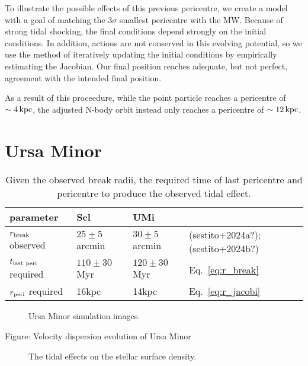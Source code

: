 To illustrate the possible effects of this previous pericentre, we
create a model with a goal of matching the \(3\sigma\) smallest
pericentre with the MW. Because of strong tidal shocking, the final
conditions depend strongly on the initial conditions. In addition,
actions are not conserved in this evolving potential, so we use the
\citet{vasiliev2024} method of iteratively updating the initial
conditions by empirically estimating the Jacobian. Our final position
reaches adequate, but not perfect, agreement with the intended final
position.

As a result of this proceedure, while the point particle reaches a
pericentre of \(\sim 4\,{\rm kpc}\), the adjusted N-body orbit instead only
reaches a pericentre of \(\sim 12\,{\rm kpc}\).

\section{Ursa Minor}\label{ursa-minor}

\begin{table*}[t]
\centering
\caption{Given the observed break radii, the required time of last pericentre and pericentre to produce the observed tidal effect.}
\begin{tabular}{llll}
\toprule
parameter & Scl & UMi & \\
\midrule
$r_{\rm break}$ observed & $25 \pm 5$ arcmin & $30 \pm 5$ arcmin & (sestito+2024a?); (sestito+2024b?)\\
$t_{\rm last\ peri}$ required & $110\pm30$ Myr & $120\pm30$ Myr & Eq. \ref{eq:r_break}\\
$r_{\rm peri}$ required & 16kpc & 14kpc & Eq. \ref{eq:r_jacobi}\\
\bottomrule
\end{tabular}
\end{table*}

\begin{figure}
\centering
{}
\caption[Ursa Minor simulation snapshots]{Ursa Minor simulation images.}
\end{figure}

Figure: Velocity dispersion evolution of Ursa Minor

\begin{figure}
\centering
{}
\caption[Ursa Minor simulated density profiles]{The tidal effects on the
stellar surface density.}
\end{figure}


